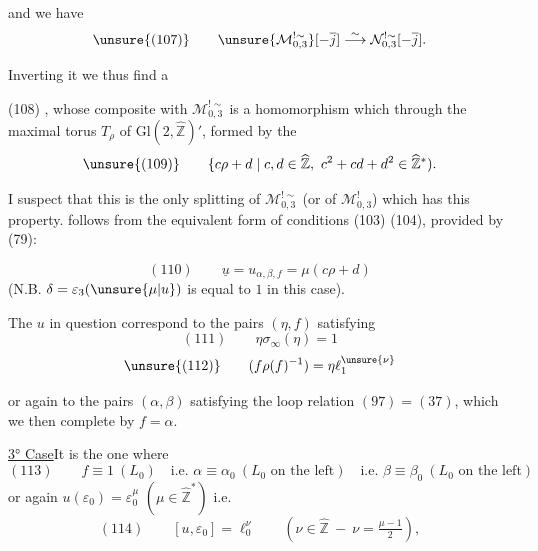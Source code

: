 
and we have
\[
 \unsure{(107)}\qquad
 \unsure{\mathcal M_{0,3}^{!\sim}}[-\overline{j}]
 \overset{\sim}{\longrightarrow}
 \mathcal N_{0,3}^{!\sim}[-\overline{j}].
\]

Inverting it we thus find a

(108)
,
whose composite with $\mathcal M_{0,3}^{!\sim}$ is a homomorphism which
through the maximal torus $T_\rho$ of $\mathrm{Gl}(2,\widehat{\mathbb Z})'$,
formed by the
\[
 \unsure{(109)}\qquad
 \{c\rho+d\mid c,d\in\widehat{\mathbb Z},\
 c^2+cd+d^2\in\widehat{\mathbb Z}^{*}).
\]

I suspect that this is the only splitting of
$\mathcal M_{0,3}^{!\sim}$
(or  of $\mathcal M_{0,3}^{!}$)
which has this property.  follows from the equivalent form
of conditions (103) (104), provided by (79):



\[
 (110)\qquad
 \underline{u}=u_{\alpha,\beta,f}=\mu(c\rho+d)
\]
(N.B. $\delta=\varepsilon_3(\unsure{\mu|u})$ is equal to $1$ in this case).

The $u$ in question correspond to the pairs $(\eta,f)$ satisfying
\[
 (111)\qquad \eta\sigma_\infty(\eta)=1
\]
\[
 \unsure{(112)}\qquad
 (f\rho(f)^{-1})=\eta\ell_1^{\unsure{\nu}}
\]



or again to the pairs $(\alpha,\beta)$ satisfying the loop relation
$(97)=(37)$, which we then complete by $f=\alpha$.

\uline{3° Case}\quad It is the one where
\[
 (113)\qquad
 f\equiv1\ (L_0)
 \quad\text{i.e. }\alpha\equiv\alpha_0\ (L_0\text{ on the left})
 \quad\text{i.e. }\beta\equiv\beta_0\ (L_0\text{ on the left})
\]
or again $u(\varepsilon_0)=\varepsilon_0^\mu$
$(\mu\in\widehat{\mathbb Z}^{*})$ i.e.
\[
 (114)\qquad
 [u,\varepsilon_0]=\ell_0^\nu
 \qquad
 (\nu\in\widehat{\mathbb Z}\ -\ \nu=\tfrac{\mu-1}{2}),
\]

